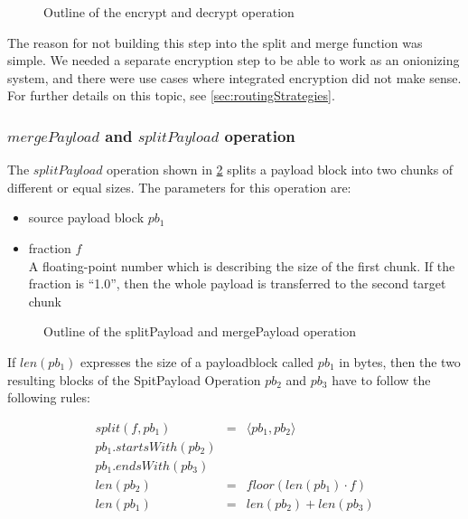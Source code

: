 \begin{figure}[ht]\centering
	\resizebox{0.35\textwidth}{!}{}
	\resizebox{0.35\textwidth}{!}{}
	\caption{Outline of the encrypt and decrypt operation}
	\label{fig:encryptOperation}
\end{figure}

The reason for not building this step into the split and merge function was simple. We needed a separate encryption step to be able to work as an onionizing system, and there were use cases where integrated encryption did not make sense. For further details on this topic, see \cref{sec:routingStrategies}.


\subsubsection{\texorpdfstring{$mergePayload$ and $splitPayload$}{mergePayload and splitPayload} operation}\label{sec:mergeAndSplit}
The $splitPayload$ operation shown in \cref{fig:mergeOperation} splits a payload block into two chunks of different or equal sizes. The parameters for this operation are:

\begin{itemize}
	\item source payload block $pb_1$
	\item fraction $f$\\
	A floating-point number which is describing the size of the first chunk. If the fraction is ``1.0'', then the whole payload is transferred to the second target chunk
\end{itemize}

\begin{figure}[ht]\centering
	\resizebox{0.43\textwidth}{!}{}
	\resizebox{0.35\textwidth}{!}{}
	\caption{Outline of the splitPayload and mergePayload operation}
	\label{fig:mergeOperation}
\end{figure}
If $len(pb_1)$ expresses the size of a payloadblock called $pb_1$ in bytes, then the two resulting blocks of the SpitPayload Operation $pb_2$ and $pb_3$ have to follow the following rules:

\begin{eqnarray}
	split(f, pb_1) & = &\langle pb_1, pb_2 \rangle\\
	pb_1.startsWith(pb_2)\\
	pb_1.endsWith(pb_3)\\
	len(pb_2) & = & floor(len(pb_1)\cdot f)\\
	len(pb_1) & = & len(pb_2) + len(pb_3)
\end{eqnarray}

